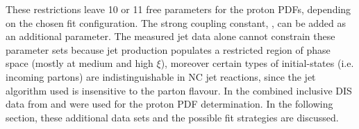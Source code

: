 These restrictions leave 10 or 11 free parameters for the proton PDFs, depending on the chosen fit configuration. The strong coupling constant, \asz, can be added as an additional parameter. The measured jet data alone cannot constrain these parameter sets because jet production populates a restricted region of phase space (mostly at medium and high $\xi$), moreover certain types of initial-states (i.e. incoming partons) are indistinguishable in NC jet reactions, since the jet algorithm used is insensitive to the parton flavour. In  the combined inclusive DIS data from \hone and \zeus were used for the proton PDF determination. In the following section, these additional data sets and the possible fit strategies are discussed.
